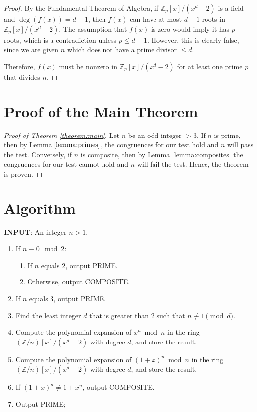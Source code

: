 \documentclass{article}
\theoremstyle{plain}
\theoremstyle{definition}
\newcommand{\Z}{\mathbb{Z}}
\newcommand{\Zn}{\Z/n}
\begin{document}
\begin{proof}
By the Fundamental Theorem of Algebra, if $\mathbb{Z}_p[x]/(x^d - 2)$ is a field and $\deg(f(x)) = d-1$, then $f(x)$ can have at most $d-1$ roots in $\mathbb{Z}_p[x]/(x^d - 2)$. The assumption that $f(x)$ is zero would imply it has $p$ roots, which is a contradiction unless $p \leq d-1$. However, this is clearly false, since we are given $n$ which does not have a prime divisor $\leq d$.

Therefore, $f(x)$ must be nonzero in $\mathbb{Z}_p[x]/(x^d - 2)$ for at least one prime $p$ that divides $n$.
\end{proof}

\section{Proof of the Main Theorem}
\begin{proof}[Proof of Theorem \ref{theorem:main}]
Let \( n \) be an odd integer $>3$. If $n$ is prime, then by Lemma $\ref{lemma:primes}$, the congruences for our test hold and $n$ will pass the test. Conversely, if $n$ is composite, then by Lemma \ref{lemma:composites} the congruences for our test cannot hold and $n$ will fail the test. Hence, the theorem is proven.
\end{proof}

\section{Algorithm} \label{section:algorithm}
\textbf{INPUT}: An integer $n > 1$.
\begin{center}
    \begin{enumerate}
        \item If $n \equiv 0 \mod{2}$:
            \begin{enumerate}
                \item If $n$ equals $2$, output PRIME.
                \item Otherwise, output COMPOSITE.
            \end{enumerate}
        \item If $n$ equals $3$, output PRIME.
        \item Find the least integer $d$ that is greater than $2$ such that $n \not\equiv 1 \pmod{d}$.
        \item Compute the polynomial expansion of $x^n \bmod{n}$ in the ring $(\Zn)[x]/(x^d-2)$ with degree $d$, and store the result.
        \item Compute the polynomial expansion of $(1 + x)^n \bmod{n}$ in the ring $(\Zn)[x]/(x^d-2)$ with degree $d$, and store the result.
        \item If $(1 + x)^n \not= 1 + x^n$, output COMPOSITE.
        \item Output PRIME;
    \end{enumerate}
\end{center}
\end{document}
